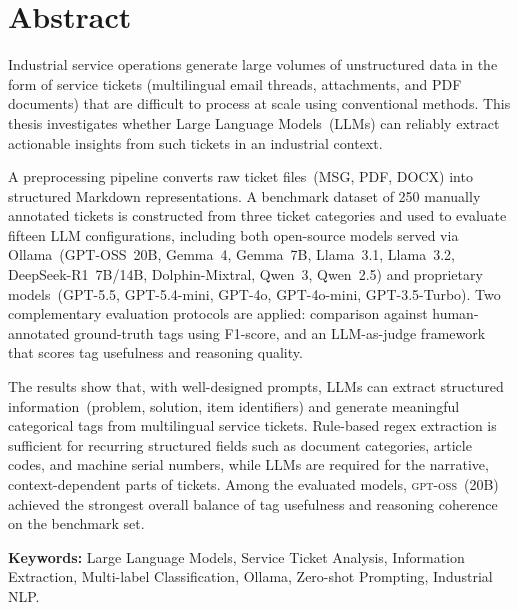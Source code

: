 \chapter*{Abstract}
\label{chap:abstract}
%
Industrial service operations generate large volumes of unstructured data in the form of
service tickets (multilingual email threads, attachments, and PDF documents) that are
difficult to process at scale using conventional methods. This thesis investigates whether
Large Language Models~(LLMs) can reliably extract actionable insights from such tickets
in an industrial context.

A preprocessing pipeline converts raw ticket files~(MSG, PDF, DOCX) into structured
Markdown representations. A benchmark dataset of 250 manually annotated tickets is
constructed from three ticket categories and used to evaluate fifteen LLM configurations,
including both open-source models served via Ollama~(GPT-OSS~20B, Gemma~4, Gemma~7B,
Llama~3.1, Llama~3.2, DeepSeek-R1~7B/14B, Dolphin-Mixtral, Qwen~3, Qwen~2.5) and
proprietary models~(GPT-5.5, GPT-5.4-mini, GPT-4o, GPT-4o-mini, GPT-3.5-Turbo). Two complementary
evaluation protocols are applied: comparison against human-annotated ground-truth tags
using F1-score, and an LLM-as-judge framework that scores tag usefulness and reasoning
quality.

The results show that, with well-designed prompts, LLMs can extract structured
information~(problem, solution, item identifiers) and generate meaningful categorical
tags from multilingual service tickets. Rule-based regex extraction is sufficient for
recurring structured fields such as document categories, article codes, and machine
serial numbers, while LLMs are required for the narrative, context-dependent parts of
tickets. Among the evaluated models, \textsc{gpt-oss}~(20B) achieved the strongest
overall balance of tag usefulness and reasoning coherence on the benchmark set.

\bigskip
\noindent\textbf{Keywords:} Large Language Models, Service Ticket Analysis, Information
Extraction, Multi-label Classification, Ollama, Zero-shot Prompting, Industrial NLP.